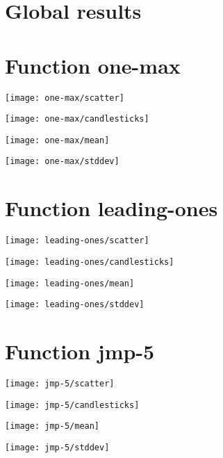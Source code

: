 \graphicspath{{../graphics/}}
\section{Global results}
\begin{center}

\end{center}
\newpage
\section{Function one-max}
\begin{center}
\texttt{[image: one-max/scatter]}
\end{center}
\begin{center}
\texttt{[image: one-max/candlesticks]}
\end{center}
\begin{center}

\end{center}
\begin{center}
\texttt{[image: one-max/mean]}
\end{center}
\begin{center}
\texttt{[image: one-max/stddev]}
\end{center}
\newpage
\section{Function leading-ones}
\begin{center}
\texttt{[image: leading-ones/scatter]}
\end{center}
\begin{center}
\texttt{[image: leading-ones/candlesticks]}
\end{center}
\begin{center}

\end{center}
\begin{center}
\texttt{[image: leading-ones/mean]}
\end{center}
\begin{center}
\texttt{[image: leading-ones/stddev]}
\end{center}
\newpage
\section{Function jmp-5}
\begin{center}
\texttt{[image: jmp-5/scatter]}
\end{center}
\begin{center}
\texttt{[image: jmp-5/candlesticks]}
\end{center}
\begin{center}

\end{center}
\begin{center}
\texttt{[image: jmp-5/mean]}
\end{center}
\begin{center}
\texttt{[image: jmp-5/stddev]}
\end{center}
\newpage
